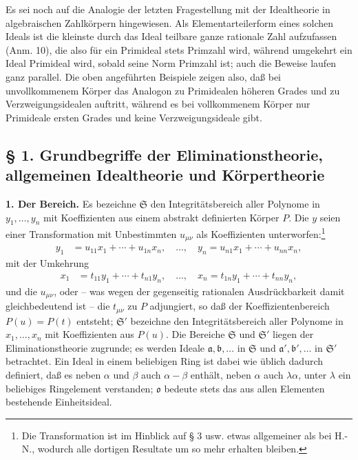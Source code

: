 \documentclass[11pt]{article}
\providecommand{\frakS}{\mathfrak S}
\providecommand{\fraka}{\mathfrak a}
\providecommand{\frakb}{\mathfrak b}
\providecommand{\frakb}{\mathfrak b}
\providecommand{\frako}{\mathfrak o}
\begin{document}
Es sei noch auf die Analogie der letzten Fragestellung mit der Idealtheorie in algebraischen Zahlkörpern hingewiesen. Als Elementarteilerform eines solchen Ideals ist die kleinste durch das Ideal teilbare ganze rationale Zahl aufzufassen (Anm. 10), die also für ein Primideal stets Primzahl wird, während umgekehrt ein Ideal Primideal wird, sobald seine Norm Primzahl ist; auch die Beweise laufen ganz parallel. Die oben angeführten Beispiele zeigen also, daß bei unvollkommenem Körper das Analogon zu Primidealen höheren Grades und zu Verzweigungsidealen auftritt, während es bei vollkommenem Körper nur Primideale ersten Grades und keine Verzweigungsideale gibt.

\subsection*{§ 1. Grundbegriffe der Eliminationstheorie, allgemeinen Idealtheorie und Körpertheorie}

\textbf{1. Der Bereich.} Es bezeichne $\frakS$ den Integritätsbereich aller Polynome in $y_1,\ldots,y_n$ mit Koeffizienten aus einem abstrakt definierten Körper $P$. Die $y$ seien einer Transformation mit Unbestimmten $u_{\mu\nu}$ als Koeffizienten unterworfen:\footnote{Die Transformation ist im Hinblick auf § 3 usw. etwas allgemeiner als bei H.-N., wodurch alle dortigen Resultate um so mehr erhalten bleiben.}
\begin{align}
 y_1&=u_{11}x_1+\cdots+u_{1n}x_n,\quad \ldots,\quad
 y_n=u_{n1}x_1+\cdots+u_{nn}x_n, \tag{1}
\end{align}
mit der Umkehrung
\begin{align}
 x_1&=t_{11}y_1+\cdots+t_{n1}y_n,\quad \ldots,\quad
 x_n=t_{1n}y_1+\cdots+t_{nn}y_n, \tag{1'}
\end{align}
und die $u_{\mu\nu}$, oder -- was wegen der gegenseitig rationalen Ausdrückbarkeit damit gleichbedeutend ist -- die $t_{\mu\nu}$ zu $P$ adjungiert, so daß der Koeffizientenbereich $P(u)=P(t)$ entsteht; $\frakS'$ bezeichne den Integritätsbereich aller Polynome in $x_1,\ldots,x_n$ mit Koeffizienten aus $P(u)$. Die Bereiche $\frakS$ und $\frakS'$ liegen der Eliminationstheorie zugrunde; es werden Ideale $\fraka,\frakb,\ldots$ in $\frakS$ und $\fraka',\frakb',\ldots$ in $\frakS'$ betrachtet. Ein Ideal in einem beliebigen Ring ist dabei wie üblich dadurch definiert, daß es neben $\alpha$ und $\beta$ auch $\alpha-\beta$ enthält, neben $\alpha$ auch $\lambda\alpha$, unter $\lambda$ ein beliebiges Ringelement verstanden; $\frako$ bedeute stets das aus allen Elementen bestehende Einheitsideal.
\end{document}
